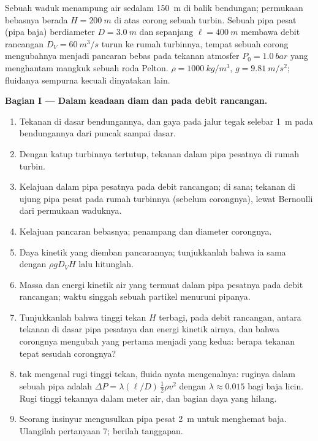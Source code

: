 \begin{problem}
\label{pb:b2:euler-bernoulli:1}

Sebuah waduk menampung air sedalam \qty{150}{m} di balik bendungan; permukaan bebasnya
berada $H = \qty{200}{m}$ di atas corong sebuah turbin. Sebuah pipa pesat (pipa
baja) berdiameter $D = \qty{3.0}{m}$ dan sepanjang $\ell = \qty{400}{m}$
membawa debit rancangan $D_V = \qty{60}{m^3/s}$ turun ke rumah turbinnya,
tempat sebuah corong mengubahnya menjadi pancaran bebas pada tekanan atmosfer $P_0 =
\qty{1.0}{bar}$ yang menghantam mangkuk sebuah roda Pelton. $\rho =
\qty{1000}{kg/m^3}$, $g = \qty{9.81}{m/s^2}$; fluidanya sempurna kecuali
dinyatakan lain.

\medskip
\noindent\textbf{Bagian I --- Dalam keadaan diam dan pada debit rancangan.}
\begin{enumerate}
  \item Tekanan di dasar bendungannya, dan gaya pada jalur tegak
        selebar \qty{1}{m} pada bendungannya dari puncak sampai dasar.
  \item Dengan katup turbinnya tertutup, tekanan dalam pipa pesatnya di
        rumah turbin.
  \item Kelajuan dalam pipa pesatnya pada debit rancangan;  di sana; tekanan di ujung pipa pesat pada rumah
        turbinnya (sebelum corongnya), lewat Bernoulli dari permukaan
        waduknya.
  \item Kelajuan pancaran bebasnya; penampang dan diameter corongnya.
  \item Daya kinetik yang diemban pancarannya; tunjukkanlah bahwa ia
        sama dengan $\rho gD_VH$ lalu hitunglah.
  \item Massa dan energi kinetik air yang termuat dalam pipa pesatnya
        pada debit rancangan; waktu singgah sebuah partikel menuruni
        pipanya.
  \item Tunjukkanlah bahwa tinggi tekan $H$ terbagi, pada debit
        rancangan, antara tekanan di dasar pipa pesatnya dan energi
        kinetik airnya, dan bahwa corongnya mengubah yang pertama
        menjadi yang kedua: berapa tekanan tepat sesudah corongnya?
  \item {} tak mengenal rugi tinggi tekan, fluida nyata
        mengenalnya: ruginya dalam sebuah pipa adalah
        $\Delta P = \lambda(\ell/D)\,\tfrac12\rho v^2$ dengan $\lambda
        \approx 0.015$ bagi baja licin. Rugi tinggi tekannya dalam meter
        air, dan bagian daya yang hilang.
  \item Seorang insinyur mengusulkan pipa pesat \qty{2}{m} untuk
        menghemat baja. Ulangilah pertanyaan 7; berilah tanggapan.
\end{enumerate}


\end{problem}
